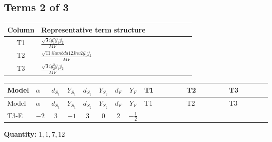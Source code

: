 \documentclass[8pt]{article}
\begin{document}
\begin{landscape}
\subsection*{Terms 2 of 3}
\begin{center}
\begin{tabular}{@{}c >{\raggedright\arraybackslash}p{0.82\linewidth}@{}}
\toprule
Column & Representative term structure \\
\midrule
T1 & \(\displaystyle \frac{\sqrt{3} i g_{1}^{2} \overline{y_{1}} \overline{y_{2}}}{MF}\) \\
\midrule
T2 & \(\displaystyle \frac{\sqrt{11} i lambda12Inv2 \overline{y_{1}} \overline{y_{2}}}{MF}\) \\
\midrule
T3 & \(\displaystyle \frac{\sqrt{3} i g_{2}^{2} \overline{y_{1}} \overline{y_{2}}}{MF}\) \\
\midrule
\bottomrule
\end{tabular}
\end{center}
\smallskip
\tiny
\begin{longtable}{@{}llcccccc >{\raggedright\arraybackslash}p{0.21\linewidth} >{\raggedright\arraybackslash}p{0.21\linewidth} >{\raggedright\arraybackslash}p{0.21\linewidth}@{}}
\toprule
Model & $\alpha$ & $d_{S_1}$ & $Y_{S_1}$ & $d_{S_2}$ & $Y_{S_2}$ & $d_F$ & $Y_F$ & T1 & T2 & T3 \\
\midrule
\endfirsthead
\toprule
Model & $\alpha$ & $d_{S_1}$ & $Y_{S_1}$ & $d_{S_2}$ & $Y_{S_2}$ & $d_F$ & $Y_F$ & T1 & T2 & T3 \\
\midrule
\endhead
T3-E & $-2$ & $3$ & $-1$ & $3$ & $0$ & $2$ & $-\frac{1}{2}$ & \scriptsize\adjustbox{max width=\linewidth}{$\begin{gathered} \frac{\sqrt{3} i g_{1}^{2} \overline{y_{1}} \overline{y_{2}}}{8 MF}\end{gathered}$} & \scriptsize\adjustbox{max width=\linewidth}{$\begin{gathered} \frac{3 \sqrt{11} i lambda12Inv2 \overline{y_{1}} \overline{y_{2}}}{22 MF}\end{gathered}$} & \scriptsize\adjustbox{max width=\linewidth}{$\begin{gathered} \frac{49 \sqrt{3} i g_{2}^{2} \overline{y_{1}} \overline{y_{2}}}{24 MF}\end{gathered}$} \\
\midrule
\bottomrule
\end{longtable}
\clearpage
\noindent\textbf{Quantity: }$\mathrm{1,1,7,12}$\par\smallskip

\end{landscape}
\end{document}
